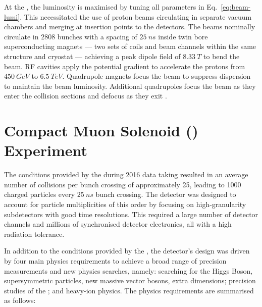 At the \LHC, the luminosity is maximised by tuning all parameters in Eq.~\eqref{eq:beam-lumi}. This necessitated the use of proton beams circulating in separate vacuum chambers and merging at insertion points to the detectors. The beams nominally circulate in 2808 bunches with a spacing of ${\SI{25}{ns}}$ inside twin bore superconducting magnets --- two sets of coils and beam channels within the same structure and cryostat --- achieving a peak dipole field of ${\SI{8.33}{T}}$ to bend the beam. RF cavities apply the potential gradient to accelerate the protons from ${\SI{450}{GeV}}$ to ${\SI{6.5}{TeV}}$. Quadrupole magnets focus the beam to suppress dispersion to maintain the beam luminosity. Additional quadrupoles focus the beam as they enter the collision sections and defocus as they exit  \cite{Bruning:782076}.


\section{Compact Muon Solenoid (\CMS) Experiment}

The conditions provided by the \LHC during 2016 data taking resulted in an average number of collisions per bunch crossing of approximately 25, leading to 1000 charged particles every ${\SI{25}{ns}}$ bunch crossing. The \CMS detector \cite{Bayatian:922757} was designed to account for particle multiplicities of this order by focusing on high-granularity subdetectors with good time resolutions. This required a large number of detector channels and millions of synchronised detector electronics, all with a high radiation tolerance.

In addition to the conditions provided by the \LHC, the \CMS detector's design was driven by four main physics requirements to achieve a broad range of precision measurements and new physics searches, namely: searching for the Higgs Boson, supersymmetric particles, new massive vector bosons, extra dimensions; precision studies of the \SM; and heavy-ion physics. The physics requirements are summarised as follows:

